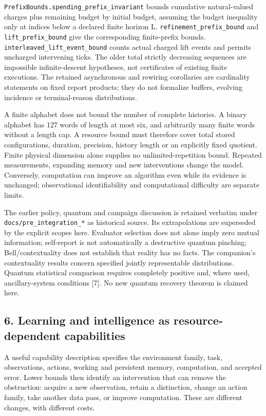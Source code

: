 \documentclass[
  10pt,
]{article}
\begin{document}
\texttt{PrefixBounds.spending\_prefix\_invariant} bounds cumulative natural-valued charges plus remaining budget by initial budget, assuming the budget inequality only at indices below a declared finite horizon L. \texttt{refinement\_prefix\_bound} and \texttt{lift\_prefix\_bound} give the corresponding finite-prefix bounds. \texttt{interleaved\_lift\_event\_bound} counts actual charged lift events and permits uncharged intervening ticks. The older total strictly decreasing sequences are impossible infinite-descent hypotheses, not certificates of existing finite executions. The retained asynchronous and rewiring corollaries are cardinality statements on fixed report products; they do not formalize buffers, evolving incidence or terminal-reason distributions.

A finite alphabet does not bound the number of complete histories. A binary alphabet has 127 words of length at most six, and arbitrarily many finite words without a length cap. A resource bound must therefore cover total stored configurations, duration, precision, history length or an explicitly fixed quotient. Finite physical dimension alone supplies no unlimited-repetition bound. Repeated measurements, expanding memory and new interventions change the model. Conversely, computation can improve an algorithm even while its evidence is unchanged; observational identifiability and computational difficulty are separate limits.

The earlier policy, quantum and campaign discussion is retained verbatim under \texttt{docs/pre\_integration\_*} as historical source. Its extrapolations are superseded by the explicit scopes here. Evaluator selection does not alone imply zero mutual information; self-report is not automatically a destructive quantum pinching; Bell/contextuality does not establish that reality has no facts. The companion's contextuality results concern specified jointly representable distributions. Quantum statistical comparison requires completely positive and, where used, ancillary-system conditions {[}7{]}. No new quantum recovery theorem is claimed here.

\subsection{6. Learning and intelligence as resource-dependent capabilities}\label{learning-and-intelligence-as-resource-dependent-capabilities}

A useful capability description specifies the environment family, task, observations, actions, working and persistent memory, computation, and accepted error. Lower bounds then identify an intervention that can remove the obstruction: acquire a new observation, retain a distinction, change an action family, take another data pass, or improve computation. These are different changes, with different costs.
\end{document}
